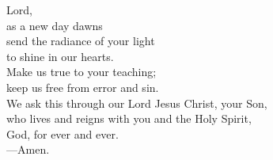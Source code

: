 \prayer


\begin{prayerverse}
Lord,\\
as a new day dawns\\
send the radiance of your light\\
to shine in our hearts.\\
Make us true to your teaching;\\
keep us free from error and sin.\\
We ask this through our Lord Jesus Christ, your Son,\\
who lives and reigns with you and the Holy Spirit,\\
God, for ever and ever.\\
{\color{red}---\thinspace}Amen.
\end{prayerverse}

